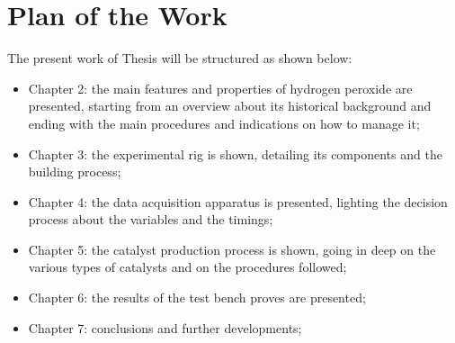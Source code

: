 \documentclass[a4paper]{report}
\begin{document}
\section{Plan of the Work}

The present work of Thesis will be structured as shown below:

\begin{itemize}
\item Chapter 2: the main features and properties of hydrogen peroxide are presented, starting from an overview about its historical background and ending with the main procedures and indications on how to manage it;
\item Chapter 3: the experimental rig is shown, detailing its components and the building process;
\item Chapter 4: the data acquisition apparatus is presented, lighting the decision process about the variables and the timings;
\item Chapter 5: the catalyst production process is shown, going in deep on the various types of catalysts and on the procedures followed;
\item Chapter 6: the results of the test bench proves are presented;
\item Chapter 7: conclusions and further developments;
\end{itemize}
\end{document}
